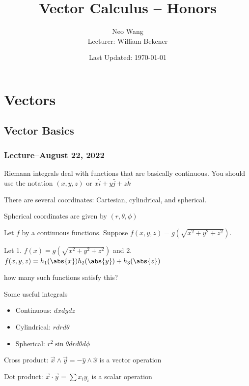 \documentclass{scrreprt}
\title{Vector Calculus -- Honors}
\author{Neo Wang\\ Lecturer: William Bekcner}
\date{Last Updated: \today}
\begin{document}
\maketitle
\tableofcontents


\chapter{Vectors}

\section{Vector Basics}

\subsection{Lecture--August 22, 2022}

Riemann integrals deal with functions that are basically continuous.
You should use the notation $(x, y, z)$ or $x\hat{i} + y\hat{j} + z\hat{k}$

There are several coordinates: Cartesian, cylindrical, and spherical.

Spherical coordinates are given by $(r, \theta, \phi)$

\begin{example}
	Let $f$ by a continuous functions. Suppose $f(x,y,z)=g(\sqrt{x^2+y^2+z^2})$.

	Let 1. $f(x)=g(\sqrt{x^2+y^2+z^2})$
	and 2. $f(x, y, z) = h_1(\abs{x})h_2(\abs{y})+h_3(\abs{z})$

	how many such functions satisfy this?
\end{example}

\begin{definition}
	Some useful integrals
	\begin{itemize}
		\item Continuous: $dxdydz$
		\item Cylindrical: $rdrd\theta$
		\item Spherical: $r^2\sin\theta drd\theta d\phi$
	\end{itemize}
\end{definition}

\begin{definition}[Vectors]
	Cross product: $\vec{x}\wedge \vec{y} = -\hat{y} \wedge \hat{x}$ is a vector operation

	Dot product: $\vec{x}\cdot \vec{y} = \sum x_i y_i$ is a scalar operation
\end{definition}
\end{document}
